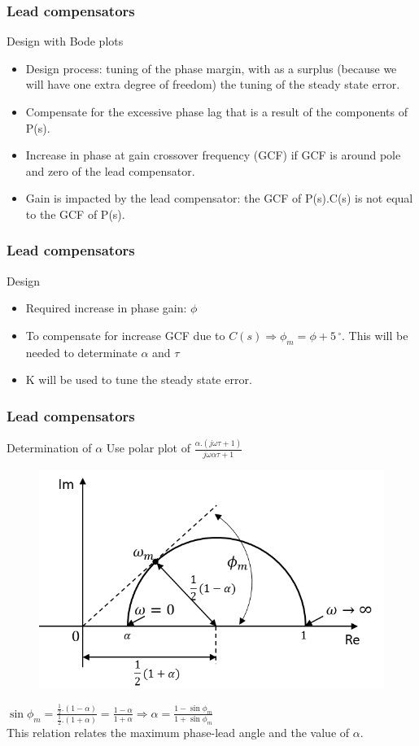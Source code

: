 \begin{frame}
\frametitle{Lead compensators}
\begin{block}{Design with Bode plots}
	\begin{itemize}
		\item Design process: tuning of the phase margin, with as a surplus (because we will have one extra degree of freedom) the tuning of the steady state error.
		\item Compensate for the excessive phase lag that is a result of the components of P(s).
		\item Increase in phase at gain crossover frequency (GCF) if GCF is around pole and zero of the lead compensator.
		\item Gain is impacted by the lead compensator: the GCF of P(s).C(s) is not equal to the GCF of P(s).
	\end{itemize}		
\end{block}
\end{frame}

\begin{frame}
	\frametitle{Lead compensators}
	\begin{block}{Design}
		\begin{itemize}
			\item Required increase in phase gain: $\phi$
			\item To compensate for increase GCF due to 
			$C(s) \Rightarrow \phi_m = \phi + 5\,^{\circ}$. This will be needed to determinate $\alpha$ and $\tau$
			\item K will be used to tune the steady state error.
		\end{itemize}		
	\end{block}
\end{frame}
\begin{frame}	
	\frametitle{Lead compensators}
	\begin{block}{Determination of $\alpha$}
		Use polar plot of 
		$\frac{\alpha.(j\omega\tau + 1)}{j\omega\alpha\tau + 1}$	
		\begin{figure}
			\centering
			\includegraphics[width=0.5
			\linewidth]{leadcompalphabepalen}
		\end{figure}
		$\sin\phi_m = \frac{\frac{1}{2}.(1 - \alpha)}{\frac{1}{2}.(1 + \alpha)} = \frac{1 - \alpha}{1 + \alpha} \Rightarrow \alpha = \frac{1 - \sin\phi_m}{1 + \sin\phi_m}$ \\
		This relation relates the maximum phase-lead angle and the value of $\alpha$.
	\end{block}
\end{frame}


